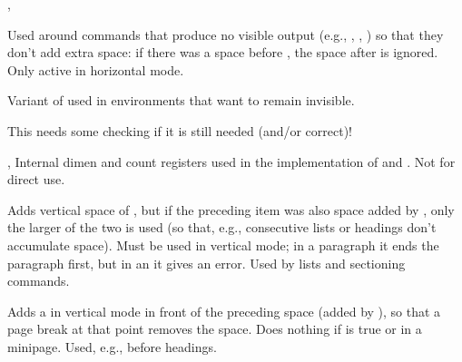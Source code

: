 \documentclass{l3in2edoc}
\begin{document}
\begin{function}[]
  {
    \@bsphack,
    \@esphack
  }
  \begin{syntax}
      
  \end{syntax}
  Used around commands that produce no visible output (e.g.,
  , , ) so that they don't add extra
  space: if there was a space before , the space after
   is ignored. Only active in horizontal mode.
\end{function}



\begin{function}[]
  {
    \@Esphack
  }
  \begin{syntax}
      
  \end{syntax}
  Variant of  used in environments that want to remain
  invisible.

  This needs some checking if it is still needed (and/or  correct)!
\end{function}



\begin{function}[int]
  {
    \@savsk,
    \@savsf
  }
%
  Internal dimen and count registers used in the implementation of
   and . Not for direct use.
\end{function}



\begin{function}[user]
  {
    \addvspace
  }
  \begin{syntax}
     
  \end{syntax}
  Adds vertical space of , but if the preceding item was
  also space added by , only the larger of the two is
  used (so that, e.g., consecutive lists or headings don't accumulate
  space). Must be used in vertical mode; in a paragraph it ends the
  paragraph first, but in an  it gives an error. Used by
  lists and sectioning commands.
\end{function}


\begin{function}[user]
  {
    \addpenalty
  }
  \begin{syntax}
     
  \end{syntax}
  Adds a  in vertical mode in front of the preceding
  space (added by ), so that a page break at that point
  removes the space. Does nothing if  is true or in a
  minipage. Used, e.g., before headings.
\end{function}
\end{document}
